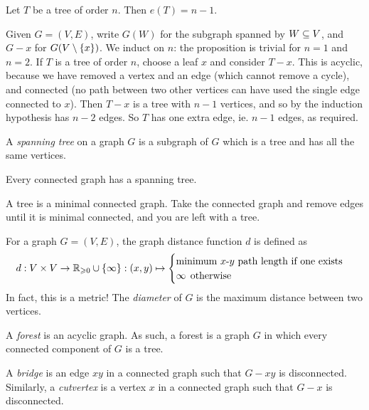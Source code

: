\documentclass{article}
\begin{document}
\begin{proposition}
	Let $T$ be a tree of order $n$. Then $e(T) = n - 1$.
\end{proposition}

\begin{prf}
Given $G = (V, E)$, write $G(W)$ for the subgraph spanned by $W \subseteq V$, and $G - x$ for $G(V \setminus \left\lbrace x \right\rbrace)$. We induct on $n$: the proposition is trivial for $n = 1$ and $n = 2$. If $T$ is a tree of order $n$, choose a leaf $x$ and consider $T - x$. This is acyclic, because we have removed a vertex and an edge (which cannot remove a cycle), and connected (no path between two other vertices can have used the single edge connected to $x$). Then $T - x$ is a tree with $n-1$ vertices, and so by the induction hypothesis has $n-2$ edges. So $T$ has one extra edge, ie. $n-1$ edges, as required.
\end{prf}

\begin{definition}
	A \textit{spanning tree} on a graph $G$ is a subgraph of $G$ which is a tree and has all the same vertices.
\end{definition}

\begin{proposition}
	Every connected graph has a spanning tree.
\end{proposition}

\begin{prf}
	A tree is a minimal connected graph. Take the connected graph and remove edges until it is minimal connected, and you are left with a tree.
\end{prf}

\begin{definition}[Distance]
	\label{distance-definition}
	For a graph $G = (V, E)$, the graph distance function $d$ is defined as
	\[
	d: V \times V \to \mathbb{R}_{\geqslant 0} \cup \left\lbrace \infty \right\rbrace : (x, y) \mapsto \begin{cases}
	\text{minimum $x$-$y$ path length if one exists} \\ \infty \mathrel{\, \text{otherwise}}
	\end{cases}
	\]
	In fact, this is a metric! The \textit{diameter} of $G$ is the maximum distance between two vertices.
\end{definition}

\begin{definition}
	\label{forest-bridge-cutvertex}
	A \textit{forest} is an acyclic graph. As such, a forest is a graph $G$ in which every connected component of $G$ is a tree.
	  
	A \textit{bridge} is an edge $xy$ in a connected graph such that $G - xy$ is disconnected. Similarly, a \textit{cutvertex} is a vertex $x$ in a connected graph such that $G - x$ is disconnected.
\end{definition}
\end{document}
